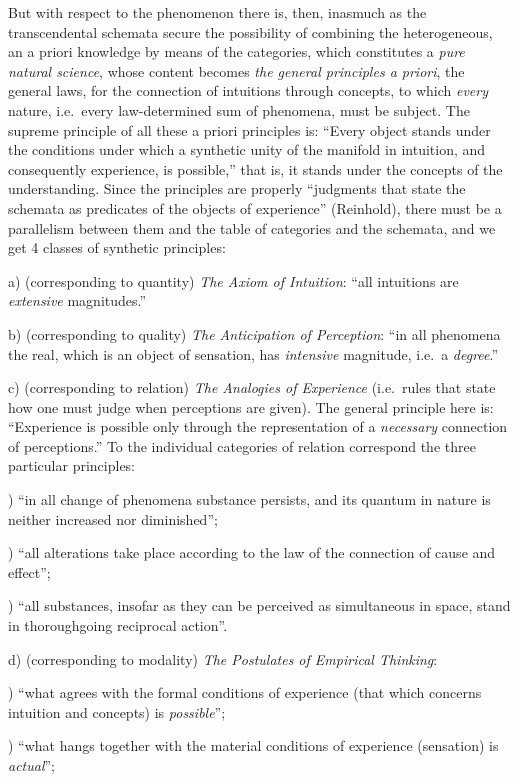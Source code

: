 But with respect to the phenomenon there is, then, inasmuch as the
transcendental schemata secure the possibility of combining the
heterogeneous, an a priori knowledge by means of the categories, which
constitutes a \emph{pure natural science}, whose content becomes
\emph{the general principles a priori}, the general laws, for the
connection of intuitions through concepts, to which \emph{every} nature,
i.e.\ every law-determined sum of phenomena, must be subject. The supreme
principle of all these a priori principles is: ``Every object stands
under the conditions under which a synthetic unity of the manifold in
intuition, and consequently experience, is possible,'' that is, it stands
under the concepts of the understanding. Since the principles are
properly ``judgments that state the schemata as predicates of the objects
of experience'' (Reinhold), there must be a parallelism between them and
the table of categories and the schemata, and we get 4 classes of
synthetic principles:

a) (corresponding to quantity) \emph{The Axiom of Intuition}: ``all
intuitions are \emph{extensive} magnitudes.''

b) (corresponding to quality) \emph{The Anticipation of Perception}: ``in
all phenomena the real, which is an object of sensation, has
\emph{intensive} magnitude, i.e.\ a \emph{degree}.''

c) (corresponding to relation) \emph{The Analogies of Experience} (i.e.\
rules that state how one must judge when perceptions are
given). The general principle here is: ``Experience is possible only
through the representation of a \emph{necessary} connection of
perceptions.'' To the individual categories of relation correspond the
three particular principles:

) ``in all change of phenomena substance persists, and its quantum
in nature is neither increased nor diminished'';

) ``all alterations take place according to the law of the
connection of cause and effect'';

) ``all substances, insofar as they can be perceived as
simultaneous in space, stand in thoroughgoing reciprocal action''.

d) (corresponding to modality) \emph{The Postulates of Empirical
Thinking}:

) ``what agrees with the formal conditions of experience (that
which concerns intuition and concepts) is \emph{possible}'';

) ``what hangs together with the material conditions of experience
(sensation) is \emph{actual}'';

